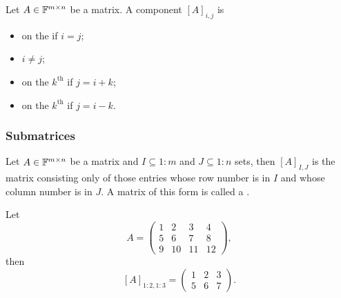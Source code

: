\begin{definition}
Let $A\in\mathbb{F}^{m\times n}$ be a matrix. A component $[A]_{i,j}$ is
\begin{itemize}
\item on the  if $i=j$;
\item {} $i\neq j$;
\item on the $k^\text{th}$  if $j = i+k$;
\item on the $k^\text{th}$  if $j = i-k$.
\end{itemize}
\end{definition}

\subsubsection{Submatrices}
Let $A\in\mathbb{F}^{m\times n}$ be a matrix and $I\subseteq 1:m$ and $J\subseteq 1:n$ sets, then $[A]_{I,J}$ is the matrix consisting only of those entries whose row number is in $I$ and whose column number is in $J$. A matrix of this form is called a .

\begin{example}
Let
\[ A = \begin{pmatrix}
1 & 2 & 3 & 4 \\ 5 & 6 & 7 & 8 \\ 9 & 10 & 11 & 12
\end{pmatrix}, \]
then
\[ [A]_{1:2,1:3} = \begin{pmatrix}
1 & 2 & 3 \\ 5 & 6 & 7
\end{pmatrix}. \]
\end{example}

